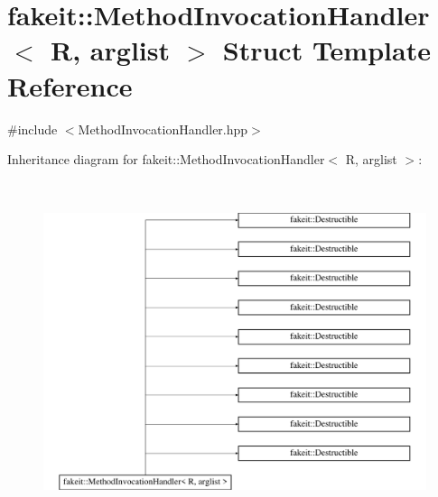 \hypertarget{structfakeit_1_1MethodInvocationHandler}{}\section{fakeit\+::Method\+Invocation\+Handler$<$ R, arglist $>$ Struct Template Reference}
\label{structfakeit_1_1MethodInvocationHandler}


{\ttfamily \#include $<$Method\+Invocation\+Handler.\+hpp$>$}

Inheritance diagram for fakeit\+::Method\+Invocation\+Handler$<$ R, arglist $>$\+:\begin{figure}[H]
\begin{center}
\leavevmode
\includegraphics[height=10.000000cm]{structfakeit_1_1MethodInvocationHandler}
\end{center}
\end{figure}
